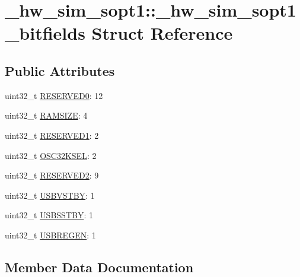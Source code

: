 \hypertarget{struct__hw__sim__sopt1_1_1__hw__sim__sopt1__bitfields}{}\section{\+\_\+hw\+\_\+sim\+\_\+sopt1\+:\+:\+\_\+hw\+\_\+sim\+\_\+sopt1\+\_\+bitfields Struct Reference}
\label{struct__hw__sim__sopt1_1_1__hw__sim__sopt1__bitfields}
\subsection*{Public Attributes}
\begin{DoxyCompactItemize}
\item 
uint32\+\_\+t \hyperlink{struct__hw__sim__sopt1_1_1__hw__sim__sopt1__bitfields_a1c935132cb8da901b6e446b06f1334e6}{R\+E\+S\+E\+R\+V\+E\+D0}\+: 12
\item 
uint32\+\_\+t \hyperlink{struct__hw__sim__sopt1_1_1__hw__sim__sopt1__bitfields_ab275f608ee4ee98f47e24de4f3eaf913}{R\+A\+M\+S\+I\+ZE}\+: 4
\item 
uint32\+\_\+t \hyperlink{struct__hw__sim__sopt1_1_1__hw__sim__sopt1__bitfields_af2a32721511ff3cf8c3a2cbb7e48b138}{R\+E\+S\+E\+R\+V\+E\+D1}\+: 2
\item 
uint32\+\_\+t \hyperlink{struct__hw__sim__sopt1_1_1__hw__sim__sopt1__bitfields_af50dd0561ff2891745d06bb10b2ddbd2}{O\+S\+C32\+K\+S\+EL}\+: 2
\item 
uint32\+\_\+t \hyperlink{struct__hw__sim__sopt1_1_1__hw__sim__sopt1__bitfields_a3366a6e96d960c2b54c74e9200530211}{R\+E\+S\+E\+R\+V\+E\+D2}\+: 9
\item 
uint32\+\_\+t \hyperlink{struct__hw__sim__sopt1_1_1__hw__sim__sopt1__bitfields_ad06eec8135d0d6262e93a55795ad8b07}{U\+S\+B\+V\+S\+T\+BY}\+: 1
\item 
uint32\+\_\+t \hyperlink{struct__hw__sim__sopt1_1_1__hw__sim__sopt1__bitfields_ae3f98afce8baf30245c4c14e2e4b900d}{U\+S\+B\+S\+S\+T\+BY}\+: 1
\item 
uint32\+\_\+t \hyperlink{struct__hw__sim__sopt1_1_1__hw__sim__sopt1__bitfields_a93b210938418acfdd5ed69f8ef809d80}{U\+S\+B\+R\+E\+G\+EN}\+: 1
\end{DoxyCompactItemize}


\subsection{Member Data Documentation}

